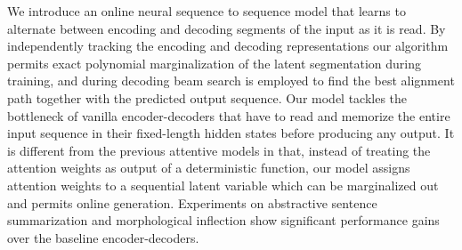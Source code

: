 We introduce an online neural sequence to sequence model that learns to alternate between encoding and decoding segments of the input as it is read. By independently tracking the encoding and decoding representations our algorithm permits exact polynomial marginalization of the latent segmentation during training, and during decoding beam search is employed to find the best alignment path together with the predicted output sequence. Our model tackles the bottleneck of vanilla encoder-decoders that have to read and memorize the entire input sequence in their fixed-length hidden states before producing any output. It is different from the previous attentive models in that, instead of treating the attention weights as output of a deterministic function, our model assigns attention weights to a sequential latent variable which can be marginalized out and permits online generation. Experiments on abstractive sentence summarization and morphological inflection show significant performance gains over the baseline encoder-decoders.
